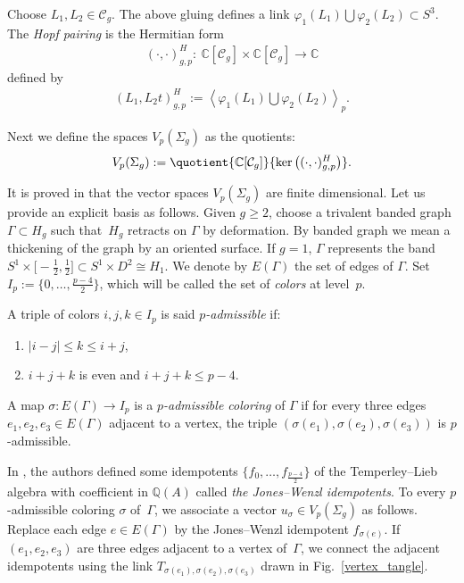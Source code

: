 Choose $L_1,L_2\in \mathcal{C}_g$. The above gluing defines a link $\varphi_1(L_1)\bigcup \varphi_2(L_2) \subset S^3$. The \textit{Hopf pairing} is the Hermitian form
\begin{gather*} ( \cdot , \cdot )_{g,p}^H \colon \ \mathbb{C}[\mathcal{C}_g]\times \mathbb{C}[\mathcal{C}_g] \rightarrow \mathbb{C}\end{gather*}
defined by \begin{gather*} ( L_1, L_2 t)_{g,p}^H := \left\langle \varphi_1(L_1)\bigcup \varphi_2(L_2) \right\rangle_p.\end{gather*}

Next we define the spaces $V_{p}(\Sigma_g)$ as the quotients:
\begin{gather*} V_{p}(\Sigma_g) := \quotient{ \mathbb{C}[\mathcal{C}_g]}{\ker \big(( \cdot , \cdot )_{g,p}^H \big)}.\end{gather*}

 It is proved in \cite{BHMV2} that the vector spaces $V_{p}(\Sigma_g)$ are finite dimensional. Let us provide an explicit basis as follows. Given $g\geq 2$, choose a trivalent banded graph $\Gamma \subset H_g$ such that~$H_g$ retracts on $\Gamma$ by deformation. By banded graph we mean a thickening of the graph by an oriented surface. If $g=1$, $\Gamma $ represents the band $S^1\times \big[{-}\frac{1}{2}, \frac{1}{2}\big] \subset S^1\times D^2 \cong H_1$. We denote by $E(\Gamma)$ the set of edges of $\Gamma$. Set $I_p:=\big\{0, \ldots, \frac{p-4}{2}\big\}$, which will be called the set of \textit{colors} at level~$p$.

A triple of colors $i,j,k \in I_p$ is said \textit{$p$-admissible} if:
\begin{enumerate}\itemsep=0pt
\item[1)] $|i-j|\leq k \leq i+j$,
\item[2)] $i+j+k$ is even and $i+j+k\leq p-4$.
\end{enumerate}

A map $\sigma \colon E(\Gamma) \rightarrow I_p$ is a \textit{$p$-admissible coloring} of $\Gamma$ if for every three edges $e_1,e_2,e_3\in E(\Gamma)$ adjacent to a vertex, the triple $(\sigma(e_1),\sigma(e_2),\sigma(e_3))$ is $p$-admissible.

In \cite{Jones_proj, Wenzl}, the authors defined some idempotents $\big\{ f_0, \ldots, f_{\frac{p-4}{2}} \big\}$ of the Temperley--Lieb algebra with coefficient in $\mathbb{Q}(A)$ called \textit{the Jones--Wenzl idempotents}. To every $p$-admissible coloring $\sigma$ of~$\Gamma$, we associate a vector $u_{\sigma}\in V_{p}(\Sigma_g)$ as follows. Replace each edge $e\in E(\Gamma)$ by the Jones--Wenzl idempotent $f_{\sigma(e)}$. If $(e_1,e_2,e_3)$ are three edges adjacent to a vertex of~$\Gamma$, we connect the adjacent idempotents using the link $T_{\sigma(e_1),\sigma(e_2),\sigma(e_3)}$ drawn in Fig.~\ref{vertex_tangle}.

